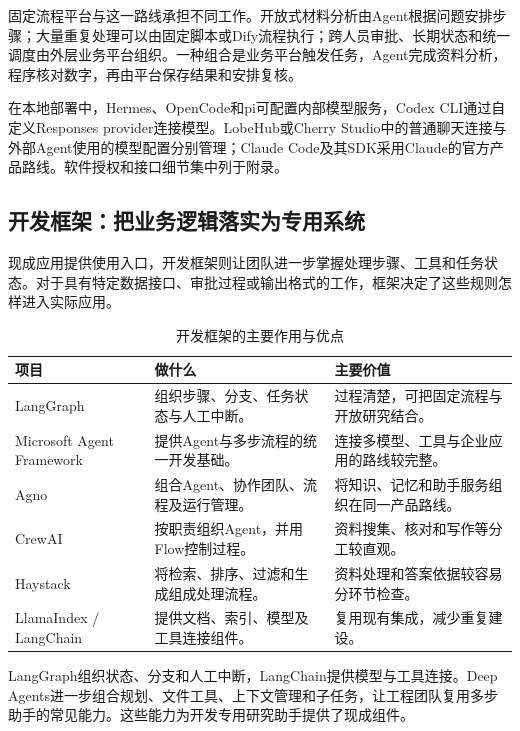 固定流程平台与这一路线承担不同工作。开放式材料分析由Agent根据问题安排步骤；大量重复处理可以由固定脚本或Dify流程执行；跨人员审批、长期状态和统一调度由外层业务平台组织。一种组合是业务平台触发任务，Agent完成资料分析，程序核对数字，再由平台保存结果和安排复核。

在本地部署中，Hermes、OpenCode和pi可配置内部模型服务，Codex CLI通过自定义Responses provider连接模型。LobeHub或Cherry Studio中的普通聊天连接与外部Agent使用的模型配置分别管理；Claude Code及其SDK采用Claude的官方产品路线。软件授权和接口细节集中列于附录。

\subsection{开发框架：把业务逻辑落实为专用系统}
现成应用提供使用入口，开发框架则让团队进一步掌握处理步骤、工具和任务状态。对于具有特定数据接口、审批过程或输出格式的工作，框架决定了这些规则怎样进入实际应用。

\begin{table}[H]\small\centering
\caption{开发框架的主要作用与优点}
\begin{tabularx}{\linewidth}{@{}P{35mm}Y Y@{}}\toprule
项目 & 做什么 & 主要价值\\\midrule
LangGraph & 组织步骤、分支、任务状态与人工中断。 & 过程清楚，可把固定流程与开放研究结合。\\
Microsoft Agent Framework & 提供Agent与多步流程的统一开发基础。 & 连接多模型、工具与企业应用的路线较完整。\\
Agno & 组合Agent、协作团队、流程及运行管理。 & 将知识、记忆和助手服务组织在同一产品路线。\\
CrewAI & 按职责组织Agent，并用Flow控制过程。 & 资料搜集、核对和写作等分工较直观。\\
Haystack & 将检索、排序、过滤和生成组成处理流程。 & 资料处理和答案依据较容易分环节检查。\\
LlamaIndex / LangChain & 提供文档、索引、模型及工具连接组件。 & 复用现有集成，减少重复建设。\\\bottomrule
\end{tabularx}
\end{table}

LangGraph组织状态、分支和人工中断，LangChain提供模型与工具连接。Deep Agents进一步组合规划、文件工具、上下文管理和子任务，让工程团队复用多步助手的常见能力。这些能力为开发专用研究助手提供了现成组件。

